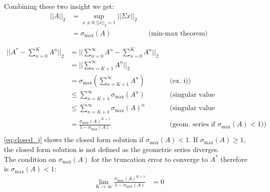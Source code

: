 \documentclass[a4paper,12pt]{ETHexercise}
\begin{document}
\begin{question}
\begin{subquestion}
		Combining these two insight we get:
		\begin{align}
			||A||_2 & = \sup_{x \neq 0, ||x||_2 = 1} ||\Sigma x||_2                               \\
			        & =\sigma_{\text{max}}(A)                       &  & \text{(min-max theorem)}
		\end{align}
	\end{subquestion}
	\begin{subquestion}
		\begin{align}
			||A^* - \sum_{n=0}^K A^n ||_2 & = || \sum_{n=0}^{\infty} A^n - \sum_{n=0}^{K} A^n ||_2                                                                                            \\
			                              & = || \sum_{n=K+1}^{\infty} A^n ||_2                                                                                                               \\
			                              & = \sigma_{\text{max}}\left(\sum_{n=K+1}^{\infty} A^n \right)      &  & \text{(ex. i))}                                                            \\
			                              & \leq \sum_{n=K+1}^{\infty} \sigma_{\text{max}} \left( A^n \right) &  & \text{(singular value inequalities)}                                       \\
			                              & \leq \sum_{n=K+1}^{\infty} \sigma_{\text{max}} \left( A \right)^n &  & \text{(singular value inequalities)}                                       \\
			                              & = \frac{\sigma_{\text{max}}(A)^{K+1}}{1 - \sigma_{\text{max}}(A)} &  & \text{(geom. series if $\sigma_{\text{max}}(A) < 1$))} \label{eq:closed_j} \\
		\end{align}
		\cref*{eq:closed_j} shows the closed form solution if $\sigma_{\text{max}}(A) < 1$. If $\sigma_{\text{max}}(A) \geq 1$, the closed form solution is not defined as the geometric series diverges.\\
		The condition on $\sigma_{\text{max}}(A)$ for the truncation error to converge to $A^*$ therefore is $\sigma_{\text{max}}(A) < 1$:
		\begin{align}
			\lim_{K \to \infty} \frac{\sigma_{\text{max}}(A)^{K+1}}{1 - \sigma_{\text{max}}(A)} & = 0
		\end{align}
	\end{subquestion}
	\begin{subquestion}

\end{subquestion}
\end{question}
\end{document}
